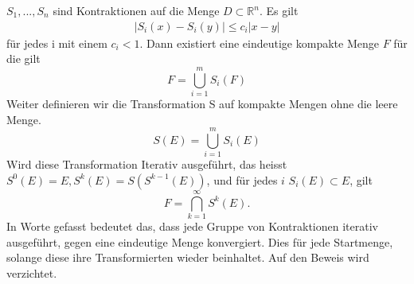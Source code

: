 $S_1,...,S_n$ sind Kontraktionen auf die Menge $D \subset \mathbb{R}^n$. Es gilt
\begin{align}
	|S_i(x) - S_i(y)| \leq c_i|x - y|
\end{align}
für jedes i mit einem $c_i < 1$. Dann existiert eine eindeutige kompakte Menge $F$ für die gilt
\begin{equation}
	F = \bigcup\limits_{i = 1}^{m} S_i(F)
\end{equation}
Weiter definieren wir die Transformation S auf kompakte Mengen ohne die leere Menge.
\begin{equation}
	S(E) = \bigcup\limits_{i = 1}^m S_i(E)
\end{equation}
Wird diese Transformation Iterativ ausgeführt, das heisst $S^0(E) = E, S^k(E) = S(S^{k-1}(E))$, und für jedes $i$ $S_i(E) \subset E$, gilt
\begin{equation}
	F = \bigcap\limits_{k = 1}^{\infty} S^k(E).
\end{equation}
In Worte gefasst bedeutet das, dass jede Gruppe von Kontraktionen iterativ ausgeführt, gegen eine eindeutige Menge konvergiert.
Dies für jede Startmenge, solange diese ihre Transformierten wieder beinhaltet.
Auf den Beweis wird verzichtet.
